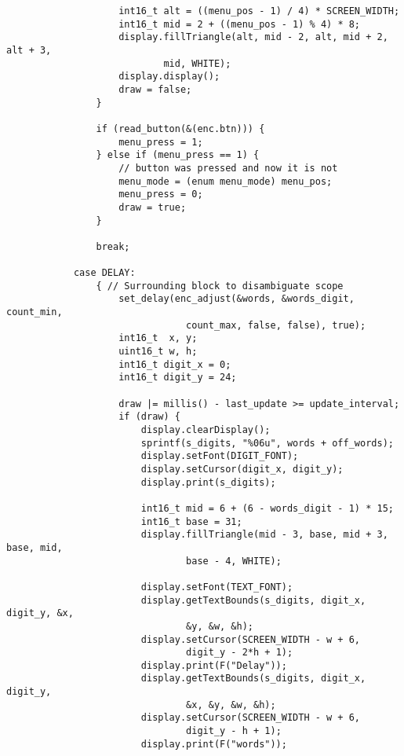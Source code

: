 \documentclass[11pt,letterpaper]{article}
\begin{document}
\begin{verbatim}
                    int16_t alt = ((menu_pos - 1) / 4) * SCREEN_WIDTH;
                    int16_t mid = 2 + ((menu_pos - 1) % 4) * 8;
                    display.fillTriangle(alt, mid - 2, alt, mid + 2, alt + 3,
                            mid, WHITE);
                    display.display();
                    draw = false;
                }
                
                if (read_button(&(enc.btn))) {
                    menu_press = 1;
                } else if (menu_press == 1) {
                    // button was pressed and now it is not
                    menu_mode = (enum menu_mode) menu_pos;
                    menu_press = 0;
                    draw = true;
                }
                
                break;
              
            case DELAY:
                { // Surrounding block to disambiguate scope
                    set_delay(enc_adjust(&words, &words_digit, count_min,
                                count_max, false, false), true);
                    int16_t  x, y;
                    uint16_t w, h;
                    int16_t digit_x = 0;
                    int16_t digit_y = 24;

                    draw |= millis() - last_update >= update_interval;
                    if (draw) {
                        display.clearDisplay();
                        sprintf(s_digits, "%06u", words + off_words);
                        display.setFont(DIGIT_FONT);
                        display.setCursor(digit_x, digit_y);
                        display.print(s_digits);
                        
                        int16_t mid = 6 + (6 - words_digit - 1) * 15;
                        int16_t base = 31;
                        display.fillTriangle(mid - 3, base, mid + 3, base, mid,
                                base - 4, WHITE);

                        display.setFont(TEXT_FONT);
                        display.getTextBounds(s_digits, digit_x, digit_y, &x,
                                &y, &w, &h);
                        display.setCursor(SCREEN_WIDTH - w + 6,
                                digit_y - 2*h + 1);
                        display.print(F("Delay"));
                        display.getTextBounds(s_digits, digit_x, digit_y,
                                &x, &y, &w, &h);
                        display.setCursor(SCREEN_WIDTH - w + 6,
                                digit_y - h + 1);
                        display.print(F("words"));
                        

\end{verbatim}
\end{document}
